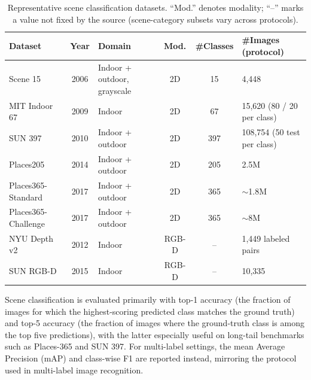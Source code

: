 \begin{table}[!t]
\centering
\caption{Representative scene classification datasets. ``Mod.'' denotes modality; ``--'' marks a value not fixed by the source (scene-category subsets vary across protocols).}
\label{tab:sceneclf_datasets}
\fontsize{9}{11}\selectfont
\setlength{\tabcolsep}{2.2mm}
\begin{tabular}{l c l c c l}
\toprule
\textbf{Dataset} & \textbf{Year} & \textbf{Domain} & \textbf{Mod.} & \textbf{\#Classes} & \textbf{\#Images (protocol)} \\
\midrule
Scene 15~\cite{lazebnik2006beyond}                    & 2006 & Indoor + outdoor, grayscale & 2D & 15  & 4,448 \\
MIT Indoor 67~\cite{quattoni2009recognizing}               & 2009 & Indoor                      & 2D & 67  & 15,620 (80 / 20 per class) \\
SUN 397~\cite{XiaoHEOT10,Xiao2014SUNDE}       & 2010 & Indoor + outdoor            & 2D & 397 & 108,754 (50 test per class) \\
Places205~\cite{zhou2014learning}          & 2014 & Indoor + outdoor            & 2D & 205 & 2.5M \\
Places365-Standard~\cite{zhou2017places}   & 2017 & Indoor + outdoor            & 2D & 365 & $\sim$1.8M \\
Places365-Challenge~\cite{zhou2017places}  & 2017 & Indoor + outdoor            & 2D & 365 & $\sim$8M \\
NYU Depth v2~\cite{silberman2012nyudv2}    & 2012 & Indoor                      & RGB-D & -- & 1,449 labeled pairs \\
SUN RGB-D~\cite{song2015sunrgbd}           & 2015 & Indoor                      & RGB-D & -- & 10,335 \\
\bottomrule
\end{tabular}
\end{table}

Scene classification is evaluated primarily with top-1 accuracy (the fraction of images for which the highest-scoring predicted class matches the ground truth) and top-5 accuracy (the fraction of images where the ground-truth class is among the top five predictions), with the latter especially useful on long-tail benchmarks such as Places-365 and SUN 397.
For multi-label settings, the mean Average Precision (mAP) and class-wise F1 are reported instead, mirroring the protocol used in multi-label image recognition.

